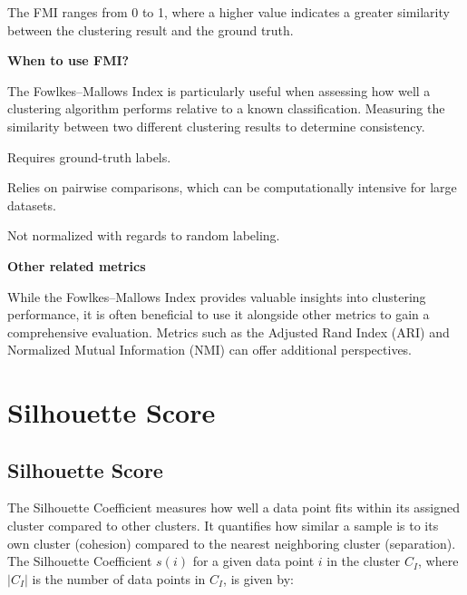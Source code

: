 The FMI ranges from 0 to 1, where a higher value indicates a greater similarity between the clustering result and the ground
truth.

\textbf{When to use FMI?}

The Fowlkes–Mallows Index is particularly useful when assessing how well a clustering algorithm performs relative to a
known classification. Measuring the similarity between two different clustering results to determine consistency.

{
    \item Requires ground-truth labels.
    \item Relies on pairwise comparisons, which can be computationally intensive for large datasets.
    \item Not normalized with regards to random labeling.
}


\clearpage

\thispagestyle{customstyle}

\textbf{Other related metrics}

While the Fowlkes–Mallows Index provides valuable insights into clustering performance, it is often beneficial to use it
alongside other metrics to gain a comprehensive evaluation. Metrics such as the Adjusted Rand Index (ARI) and Normalized Mutual
Information (NMI) can offer additional perspectives.


\clearpage
\thispagestyle{clusteringstyle}
\section{Silhouette Score}
\subsection{Silhouette Score}

The Silhouette Coefficient measures how well a data point fits within its assigned cluster compared to other clusters. 
It quantifies how similar a sample is to its own cluster (cohesion) compared to the nearest neighboring cluster (separation).
The Silhouette Coefficient $s(i)$ for a given data point $i$ in the cluster $C_I$, where $|C_I|$ is the number of data points in $C_I$, is given by:

